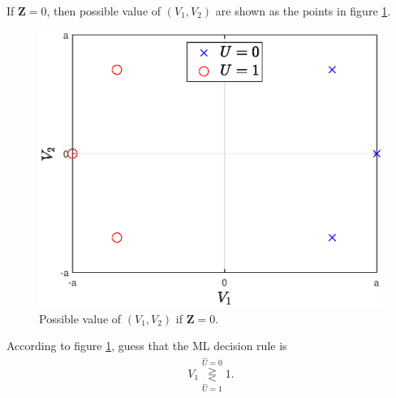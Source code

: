 \documentclass{assignment}
\begin{document}
\begin{sol}
    If $\bm{Z}=0$, then possible value of $(V_1,V_2)$ are shown as the points in figure \ref{P-2}.
    \begin{figure}[H]
        \centering
        \includegraphics[width=.4\columnwidth]{A-11-P-2.eps}
        \caption{Possible value of $(V_1,V_2)$ if $\bm{Z}=0$.}
        \label{P-2}
    \end{figure}

    According to figure \ref{P-2}, guess that the ML decision rule is
    \begin{align}
        V_1\overset{\hat{U}=0}{\underset{\hat{U}=1}{\gtreqless}}1.
    \end{align}


\end{sol}
\end{document}
